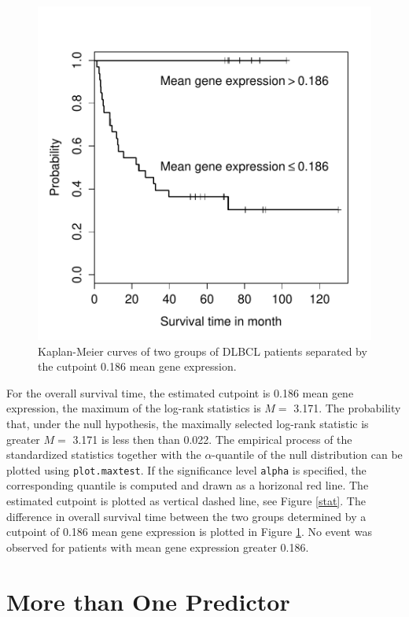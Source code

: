 \documentclass{article}
\begin{document}
\begin{figure}[t]
\begin{center}
\includegraphics{maxstat-DLBCL-fig2}
\caption{Kaplan-Meier curves of two groups of DLBCL patients separated by the
cutpoint 0.186 mean gene expression. \label{surv}}
\end{center}
\end{figure}


For the overall survival time, the estimated cutpoint is
0.186 mean gene
expression, the maximum of the log-rank statistics is $M =$
3.171. The
probability that, under the null hypothesis, the maximally selected log-rank
statistic is greater $M =$
3.171 is less then than
0.022. 
The empirical process of the standardized
statistics together with the $\alpha$-quantile of the null distribution 
can be plotted using \texttt{plot.maxtest}. 
If the significance level \texttt{alpha} is specified, 
the corresponding quantile is computed and drawn
as a horizonal red line. 
The estimated cutpoint is plotted as vertical dashed line, see Figure
\ref{stat}. 
The difference in overall survival time between the two groups determined by
a cutpoint of 0.186 mean gene expression is plotted in Figure
\ref{surv}. No event was observed for patients with mean gene expression
greater 0.186.

\section{More than One Predictor}
\end{document}
